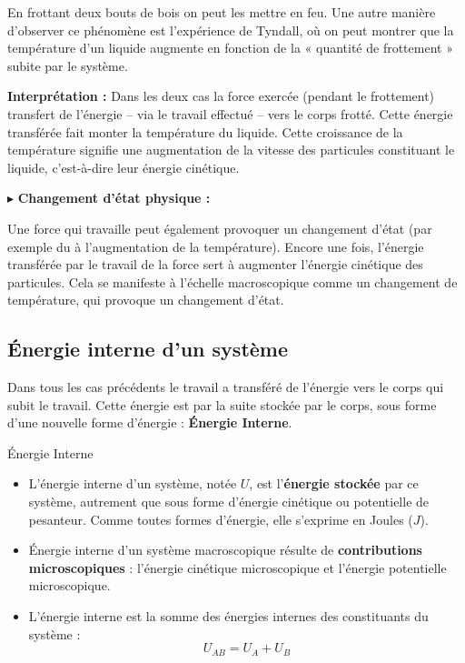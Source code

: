 \documentclass[11pt,a4paper]{article}
\begin{document}
En frottant deux bouts de bois on peut les mettre en feu.  Une autre manière d’observer ce phénomène est l’expérience de Tyndall, où on peut montrer que la température d’un liquide augmente en fonction de la « quantité de frottement » subite par le système.  

\textbf{Interprétation : } Dans les deux cas la force exercée (pendant le frottement) transfert de l’énergie – via le travail effectué – vers le corps frotté.  Cette énergie transférée fait monter la température du liquide.  Cette croissance de la température signifie une augmentation de la vitesse des particules constituant le liquide, c'est-à-dire leur énergie cinétique.

$\blacktriangleright$ \textbf{Changement d'état physique : }

Une force qui travaille peut également provoquer un changement d’état (par exemple du à l’augmentation de la température).  Encore une fois, l’énergie transférée par le travail de la force sert à augmenter l’énergie cinétique des particules.  Cela se manifeste à l’échelle macroscopique comme un changement de température, qui provoque un changement d’état. 

\subsection{Énergie interne d'un système}
Dans tous les cas précédents le travail a transféré de l’énergie vers le corps qui subit le travail.  Cette énergie est par la suite stockée par le corps, sous forme d’une nouvelle forme d’énergie : \textbf{Énergie Interne}.

\begin{defn}{Énergie Interne }
\begin{itemize}
    \item L’énergie interne d’un système, notée $U$, est l’\textbf{énergie stockée} par ce système, autrement que sous forme d’énergie cinétique ou potentielle de pesanteur.  Comme toutes formes d’énergie, elle s’exprime en Joules ($J$).
    \item Énergie interne d’un système macroscopique résulte de \textbf{contributions microscopiques} : l’énergie cinétique microscopique et l’énergie potentielle microscopique. 
    \item L’énergie interne est la somme des énergies internes des constituants du système : 
    \[ U_{AB} = U_A + U_B   \]
\end{itemize}
\end{defn}
\end{document}
